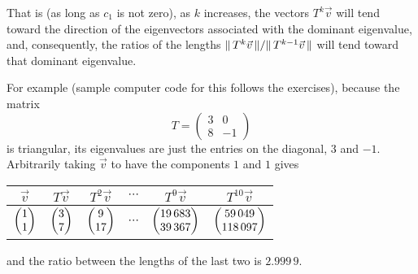 That is (as long as $c_1$ is not zero),
as $k$ increases, the vectors $T^k\vec{v}$ will tend toward the direction of 
the eigenvectors associated with the dominant eigenvalue,
and, consequently,
the ratios of the lengths $\|\,T^{k}\vec{v}\,\|/\|\,T^{k-1}\vec{v}\,\|$ 
will tend toward that dominant eigenvalue.

For example (sample computer code for this follows the exercises), because
the matrix 
\begin{equation*}
  T=\begin{pmatrix}
    3  &0  \\
    8  &-1
  \end{pmatrix}
\end{equation*}
is triangular, its eigenvalues are just the entries on the diagonal, $3$
and $-1$.
Arbitrarily taking $\vec{v}$ to have the components $1$ and $1$ gives 
\begin{center}
  \begin{tabular}{c|ccccc}
     $\vec{v}$  &$T\vec{v}$  &$T^2\vec{v}$ 
        &$\cdots$ &$T^9\vec{v}$ &$T^{10}\vec{v}$        \\ \hline 
     $\begin{pmatrix} 1 \\ 1 \end{pmatrix}$  &$\begin{pmatrix} 3 \\ 7 \end{pmatrix}$ &$\begin{pmatrix} 9 \\ 17 \end{pmatrix}$ 
        &$\cdots$  &$\begin{pmatrix} 19\,683 \\ 39\,367 \end{pmatrix}$   
        &$\begin{pmatrix} 59\,049 \\ 118\,097 \end{pmatrix}$
  \end{tabular}
\end{center}
and the ratio between the lengths of the last two is $2.999\,9$.

